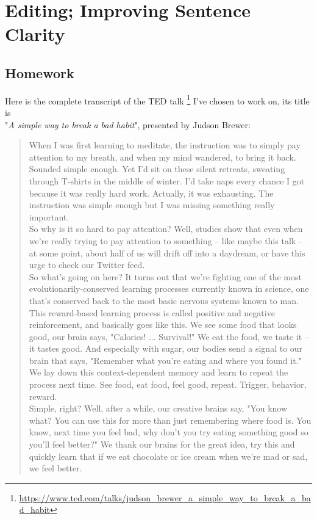 
\chapter{Editing; Improving Sentence Clarity}

\section{Homework}

Here is the complete transcript of the TED talk
\footnote{\url{https://www.ted.com/talks/judson_brewer_a_simple_way_to_break_a_bad_habit}}
I've chosen to work on, its title is \\
"\emph{A simple way to break a bad habit}", presented by Judson Brewer:
\begin{quote}
When I was first learning to meditate, the instruction was to simply pay attention to my breath, and when my mind wandered, to bring it back.\\
Sounded simple enough. Yet I'd sit on these silent retreats, sweating through T-shirts in the middle of winter. I'd take naps every chance I got because it was really hard work. Actually, it was exhausting. The instruction was simple enough but I was missing something really important.\\
So why is it so hard to pay attention? Well, studies show that even when we're really trying to pay attention to something -- like maybe this talk -- at some point, about half of us will drift off into a daydream, or have this urge to check our Twitter feed.\\
So what's going on here? It turns out that we're fighting one of the most evolutionarily-conserved learning processes currently known in science, one that's conserved back to the most basic nervous systems known to man.\\
This reward-based learning process is called positive and negative reinforcement, and basically goes like this. We see some food that looks good, our brain says, "Calories! ... Survival!" We eat the food, we taste it -- it tastes good. And especially with sugar, our bodies send a signal to our brain that says, "Remember what you're eating and where you found it." We lay down this context-dependent memory and learn to repeat the process next time. See food, eat food, feel good, repeat. Trigger, behavior, reward.\\
Simple, right? Well, after a while, our creative brains say, "You know what? You can use this for more than just remembering where food is. You know, next time you feel bad, why don't you try eating something good so you'll feel better?" We thank our brains for the great idea, try this and quickly learn that if we eat chocolate or ice cream when we're mad or sad, we feel better.\\

\end{quote}
